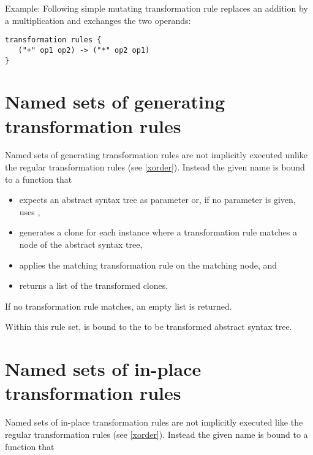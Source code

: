 \noindent
Example: Following simple mutating transformation rule replaces
an addition by a multiplication and exchanges the two operands:

\begin{lstlisting}
transformation rules {
   ("+" op1 op2) -> ("*" op2 op1)
}
\end{lstlisting}

\section{Named sets of generating transformation rules}\label{named-trrules}

Named sets of generating transformation rules are not implicitly
executed unlike the regular transformation rules (see \ref{xorder}).
Instead the given name is bound to a function that

\begin{itemize}
   \item expects an abstract syntax tree
      as parameter or, if no parameter is given, uses ,
   \item generates a clone for each instance where a
      transformation rule matches a node of the abstract syntax tree,
   \item applies the matching transformation rule on the matching node, and
   \item returns a list of the transformed clones.
\end{itemize}

\noindent
If no transformation rule matches, an empty list is returned.

Within this rule set,  is bound to the
to be transformed abstract syntax tree.

\begin{grammar}
      \produces {} 
	 \lextoken{\{} 
	 \lextoken{\}}
\end{grammar}

\section{Named sets of in-place transformation rules}
\label{named-inplace-trrules}

Named sets of in-place transformation rules are not implicitly executed
like the regular transformation rules (see \ref{xorder}). Instead the
given name is bound to a function that

